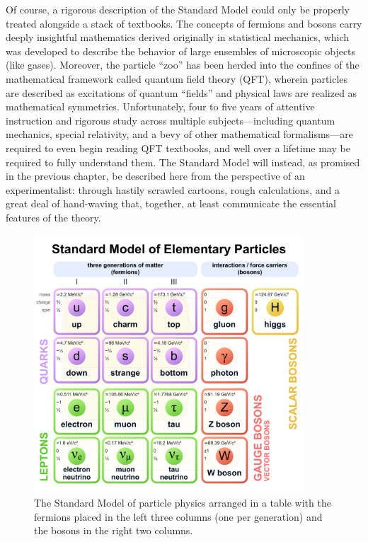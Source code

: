 Of course, a rigorous description of the Standard Model could only be properly treated alongside a stack of textbooks. 
The concepts of fermions and bosons carry deeply insightful mathematics derived originally in statistical mechanics, which was developed to describe the behavior of large ensembles of microscopic objects (like gases). 
Moreover, the particle ``zoo'' has been herded into the confines of the mathematical framework called quantum field theory (QFT), wherein particles are described as excitations of quantum ``fields'' and physical laws are realized as mathematical symmetries. 
Unfortunately, four to five years of attentive instruction and rigorous study across multiple subjects---including quantum mechanics, special relativity, and a bevy of other mathematical formalisms---are required to even begin reading QFT textbooks, and well over a lifetime may be required to fully understand them\footnotemark{}. 
The Standard Model will instead, as promised in the previous chapter, be described here from the perspective of an experimentalist: through hastily scrawled cartoons, rough calculations, and a great deal of hand-waving that, together, at least communicate the essential features of the theory. 

\begin{figure}[htb]
    \centering
    \includegraphics[width=0.9\textwidth]{fig/standard_model.pdf}
    \caption[The Standard Model of particle physics]{
        The Standard Model of particle physics arranged in a table with the fermions placed in the left three columns (one per generation) and the bosons in the right two columns.
    }
    \label{fig:standard_model}
\end{figure}

